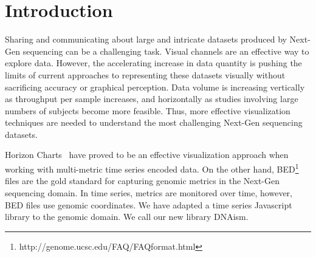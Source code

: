 \documentclass{bioinfo}
\begin{document}
\section{Introduction}

Sharing and communicating about large and intricate datasets produced by
Next-Gen sequencing can be a challenging task. Visual channels are an effective
way to explore data. However, the accelerating increase in data quantity is
pushing the limits of current approaches to representing these datasets
visually without sacrificing accuracy or graphical perception.  Data volume is
increasing vertically as throughput per sample increases, and horizontally as
studies involving large numbers of subjects become more feasible.  Thus, more
effective visualization techniques are needed to understand the most
challenging Next-Gen sequencing datasets.

Horizon Charts~\citep{time-in-the-horizon} have proved to be an effective
visualization approach when working with multi-metric time series encoded data.
On the other hand, BED\footnote{http://genome.ucsc.edu/FAQ/FAQformat.html}
files are the gold standard for capturing genomic metrics in the Next-Gen
sequencing domain. In time series, metrics are monitored over time, however,
BED files use genomic coordinates. We have adapted a time series Javascript
library to the genomic domain. We call our new library DNAism.
\end{document}
